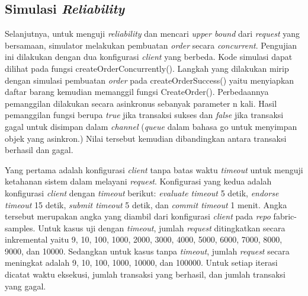 \subsection{Simulasi \textit{Reliability}}
Selanjutnya, untuk menguji \textit{reliability} dan mencari \textit{upper bound} dari \textit{request} yang bersamaan, simulator melakukan pembuatan \textit{order} secara \textit{concurrent}. Pengujian ini dilakukan dengan dua konfigurasi \textit{client} yang berbeda. Kode simulasi dapat dilihat pada fungsi createOrderConcurrently(). Langkah yang dilakukan mirip dengan simulasi pembuatan \textit{order} pada createOrderSuccess() yaitu menyiapkan daftar barang kemudian memanggil fungsi CreateOrder(). Perbedaannya pemanggilan dilakukan secara asinkronus sebanyak parameter n kali. Hasil pemanggilan fungsi berupa \textit{true} jika transaksi sukses dan \textit{false} jika transaksi gagal untuk disimpan dalam \textit{channel} (\textit{queue} dalam bahasa go untuk menyimpan objek yang asinkron.) Nilai tersebut kemudian dibandingkan antara transaksi berhasil dan gagal. 

Yang pertama adalah konfigurasi \textit{client} tanpa batas waktu \textit{timeout} untuk menguji ketahanan sistem dalam melayani \textit{request}. Konfigurasi yang kedua adalah konfigurasi \textit{client} dengan \textit{timeout} berikut: \textit{evaluate timeout} 5 detik, \textit{endorse timeout} 15 detik, \textit{submit timeout} 5 detik, dan \textit{commit timeout} 1 menit. Angka tersebut merupakan angka yang diambil dari konfigurasi \textit{client} pada \textit{repo} fabric-samples. Untuk kasus uji dengan \textit{timeout}, jumlah \textit{request} ditingkatkan secara inkremental yaitu 9, 10, 100, 1000, 2000, 3000, 4000, 5000, 6000, 7000, 8000, 9000, dan 10000. Sedangkan untuk kasus tanpa \textit{timeout}, jumlah \textit{request} secara meningkat adalah 9, 10, 100, 1000, 10000, dan 100000. Untuk setiap iterasi dicatat waktu eksekusi, jumlah transaksi yang berhasil, dan jumlah transaksi yang gagal. 

